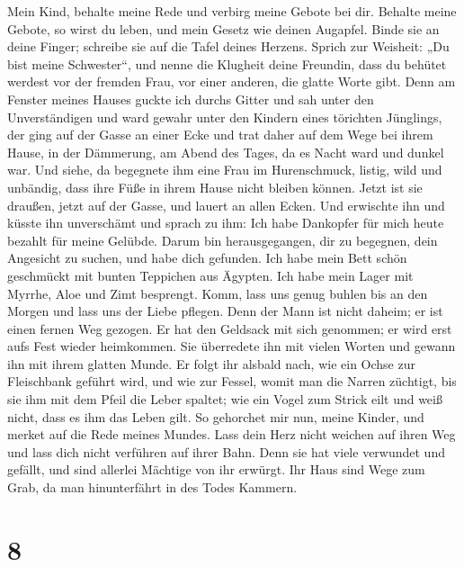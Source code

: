  Mein Kind, behalte meine Rede und verbirg meine Gebote
bei dir.  Behalte meine Gebote, so wirst du leben, und
mein Gesetz wie deinen Augapfel.  Binde sie an deine
Finger; schreibe sie auf die Tafel deines Herzens.  Sprich
zur Weisheit: „Du bist meine Schwester``, und nenne die Klugheit deine
Freundin,  dass du behütet werdest vor der fremden Frau,
vor einer anderen, die glatte Worte gibt.  Denn am Fenster
meines Hauses guckte ich durchs Gitter  und sah unter den
Unverständigen und ward gewahr unter den Kindern eines törichten
Jünglings,  der ging auf der Gasse an einer Ecke und trat
daher auf dem Wege bei ihrem Hause,  in der Dämmerung, am
Abend des Tages, da es Nacht ward und dunkel war.  Und
siehe, da begegnete ihm eine Frau im Hurenschmuck, listig,
 wild und unbändig, dass ihre Füße in ihrem Hause nicht
bleiben können.  Jetzt ist sie draußen, jetzt auf der
Gasse, und lauert an allen Ecken.  Und erwischte ihn und
küsste ihn unverschämt und sprach zu ihm:  Ich habe
Dankopfer für mich heute bezahlt für meine Gelübde. 
Darum bin herausgegangen, dir zu begegnen, dein Angesicht zu suchen, und
habe dich gefunden.  Ich habe mein Bett schön geschmückt
mit bunten Teppichen aus Ägypten.  Ich habe mein Lager
mit Myrrhe, Aloe und Zimt besprengt.  Komm, lass uns
genug buhlen bis an den Morgen und lass uns der Liebe pflegen.
 Denn der Mann ist nicht daheim; er ist einen fernen Weg
gezogen.  Er hat den Geldsack mit sich genommen; er wird
erst aufs Fest wieder heimkommen.  Sie überredete ihn mit
vielen Worten und gewann ihn mit ihrem glatten Munde.  Er
folgt ihr alsbald nach, wie ein Ochse zur Fleischbank geführt wird, und
wie zur Fessel, womit man die Narren züchtigt,  bis sie
ihm mit dem Pfeil die Leber spaltet; wie ein Vogel zum Strick eilt und
weiß nicht, dass es ihm das Leben gilt.  So gehorchet mir
nun, meine Kinder, und merket auf die Rede meines Mundes.
 Lass dein Herz nicht weichen auf ihren Weg und lass dich
nicht verführen auf ihrer Bahn.  Denn sie hat viele
verwundet und gefällt, und sind allerlei Mächtige von ihr erwürgt.
 Ihr Haus sind Wege zum Grab, da man hinunterfährt in des
Todes Kammern.

\hypertarget{section-7}{%
\section{8}\label{section-7}}

